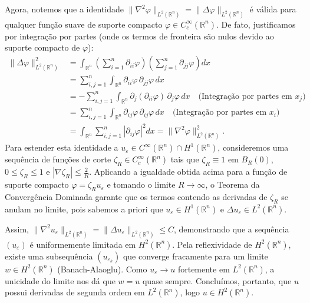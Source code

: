 \documentclass[cs_edp_2026.1.tex]{subfiles} %
\begin{document}
{	Agora, notemos que a identidade $\|\nabla^2 \varphi\|_{L^2(\mathbb{R}^n)} = \|\Delta \varphi\|_{L^2(\mathbb{R}^n)}$ é válida para qualquer função suave de suporte compacto $\varphi \in C_c^\infty(\mathbb{R}^n)$. De fato, justificamos por integração por partes (onde os termos de fronteira são nulos devido ao suporte compacto de $\varphi$):
	\begin{align*}
		\|\Delta \varphi\|_{L^2(\mathbb{R}^n)}^2 &= \int_{\mathbb{R}^n} \left( \sum_{i=1}^n \partial_{ii} \varphi \right) \left( \sum_{j=1}^n \partial_{jj} \varphi \right) dx \\
		&= \sum_{i,j=1}^n \int_{\mathbb{R}^n} \partial_{ii} \varphi \, \partial_{jj} \varphi \, dx \\
		&= -\sum_{i,j=1}^n \int_{\mathbb{R}^n} \partial_j(\partial_{ii} \varphi) \, \partial_j \varphi \, dx \quad \text{(Integração por partes em $x_j$)} \\
		&= \sum_{i,j=1}^n \int_{\mathbb{R}^n} \partial_{ij} \varphi \, \partial_{ij} \varphi \, dx \quad \text{(Integração por partes em $x_i$)} \\
		&= \int_{\mathbb{R}^n} \sum_{i,j=1}^n |\partial_{ij} \varphi|^2 dx = \|\nabla^2 \varphi\|_{L^2(\mathbb{R}^n)}^2.
	\end{align*}
	Para estender esta identidade a $u_\varepsilon \in C^\infty(\mathbb{R}^n) \cap H^1(\mathbb{R}^n)$, consideremos uma sequência de funções de corte $\zeta_R \in C_c^\infty(\mathbb{R}^n)$ tais que $\zeta_R \equiv 1$ em $B_R(0)$, $0 \le \zeta_R \le 1$ e $|\nabla \zeta_R| \le \tfrac{2}{R}$. Aplicando a igualdade obtida acima para a função de suporte compacto $\varphi = \zeta_R u_\varepsilon$ e tomando o limite $R \to \infty$, o Teorema da Convergência Dominada garante que os termos contendo as derivadas de $\zeta_R$ se anulam no limite, pois sabemos a priori que $u_\varepsilon \in H^1(\mathbb{R}^n)$ e $\Delta u_\varepsilon \in L^2(\mathbb{R}^n)$. 
	
	Assim, $\|\nabla^2 u_\varepsilon\|_{L^2(\mathbb{R}^n)} = \|\Delta u_\varepsilon\|_{L^2(\mathbb{R}^n)} \le C$, demonstrando que a sequência $(u_\varepsilon)$ é uniformemente limitada em $H^2(\mathbb{R}^n)$. Pela reflexividade de $H^2(\mathbb{R}^n)$, existe uma subsequência $(u_{\varepsilon_k})$ que converge fracamente para um limite $w \in H^2(\mathbb{R}^n)$ (Banach-Alaoglu). Como $u_\varepsilon \to u$ fortemente em $L^2(\mathbb{R}^n)$, a unicidade do limite nos dá que $w = u$ quase sempre. Concluímos, portanto, que $u$ possui derivadas de segunda ordem em $L^2(\mathbb{R}^n)$, logo $\boxed{u \in H^2(\mathbb{R}^n)}$.
}
\end{document}
